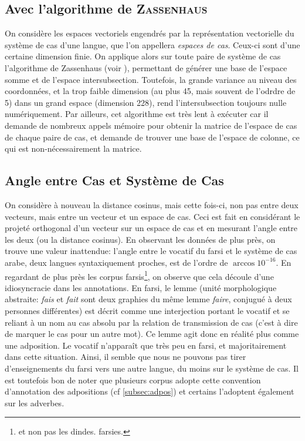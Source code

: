 \documentclass{cours}
\begin{document}
\subsection{Avec l'algorithme de \textsc{Zassenhaus}}\label{subsec:zassenhaus}
On considère les espaces vectoriels engendrés par la représentation vectorielle du système de cas d'une langue, que l'on appellera \textit{espaces de cas}.
Ceux-ci sont d'une certaine dimension finie.
On applique alors sur toute paire de système de cas l'algorithme de Zassenhaus (voir \cite{zassenhaus}), permettant de générer une base de l'espace somme et de l'espace intersubsection.
Toutefois, la grande variance au niveau des coordonnées, et la trop faible dimension (au plus 45, mais souvent de l'odrdre de 5) dans un grand espace (dimension 228), rend l'intersubsection toujours nulle numériquement.
Par ailleurs, cet algorithme est très lent à exécuter car il demande de nombreux appels mémoire pour obtenir la matrice de l'espace de cas de chaque paire de cas, et demande de trouver une base de l'espace de colonne, ce qui est non-nécessairement la matrice.

\subsection{Angle entre Cas et Système de Cas}\label{subsec:projection}
On considère à nouveau la distance cosinus, mais cette fois-ci, non pas entre deux vecteurs, mais entre un vecteur et un espace de cas.
Ceci est fait en considérant le projeté orthogonal d'un vecteur sur un espace de cas et en mesurant l'angle entre les deux (ou la distance cosinus).
En observant les données de plus près, on trouve une valeur inattendue: l'angle entre le vocatif du farsi et le système de cas arabe, deux langues syntaxiquement proches, est de l'ordre de $\arccos{10^{-16}}$.
En regardant de plus près les corpus farsis\footnote{et non pas les dindes. farsies.}, on observe que cela découle d'une idiosyncracie dans les annotations.
En farsi, le lemme (unité morphologique abstraite: \textsl{fais} et \textsl{fait} sont deux graphies du même lemme \textsl{faire}, conjugué à deux personnes différentes)\label{farsi}
est décrit comme une interjection portant le vocatif et se reliant à un nom au cas absolu par la relation de transmission de cas (c'est à dire de marquer le cas pour un autre mot).
Ce lemme agit donc en réalité plus comme une adposition.
Le vocatif n'apparaît que très peu en farsi, et majoritairement dans cette situation.
Ainsi, il semble que nous ne pouvons pas tirer d'enseignements du farsi vers une autre langue, du moins sur le système de cas.
Il est toutefois bon de noter que plusieurs corpus adopte cette convention d'annotation des adpositions (cf \ref{subsec:adpos}) et certains l'adoptent également sur les adverbes.\\
\end{document}
